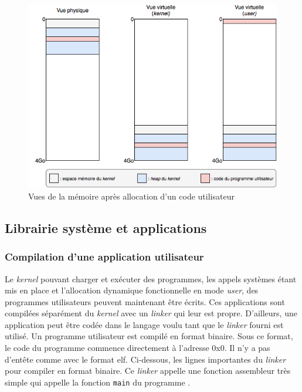 \begin{figure}[!h]
  \centering
  \includegraphics[scale=.7]{images/alloc_user.png}
  \caption{Vues de la mémoire après allocation d'un code utilisateur}
  \label{mem_view_user}
\end{figure}


\subsection{Librairie système et applications}
\subsubsection{Compilation d'une application utilisateur}
Le \textit{kernel} pouvant charger et exécuter des programmes, les appels systèmes
étant mis en place et l'allocation dynamique fonctionnelle en mode \textit{user},
des programmes utilisateurs peuvent maintenant être écrits. Ces applications
sont compilées séparément du \textit{kernel} avec un \textit{linker} qui leur
est propre. D'ailleurs, une application peut être codée dans le langage voulu
tant que le \textit{linker} fourni est utilisé. Un programme utilisateur est
compilé en format binaire. Sous ce format, le code du programme commence directement
à l'adresse 0x0. Il n'y a pas d'entête comme avec le format \acrshort{elf}.
Ci-dessous, les lignes importantes du \textit{linker} pour compiler en format
binaire. Ce \textit{linker} appelle une fonction assembleur très simple qui
appelle la fonction \texttt{main} du programme \cite{ref42}. \\

